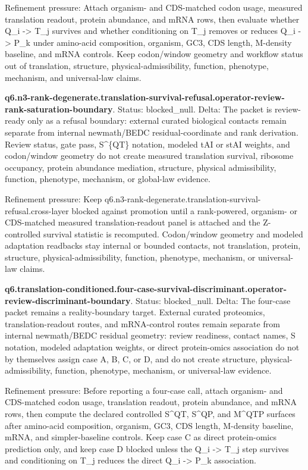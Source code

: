 Refinement pressure: Attach organism- and CDS-matched codon usage, measured translation readout, protein abundance, and mRNA rows, then evaluate whether Q\_i -> T\_j survives and whether conditioning on T\_j removes or reduces Q\_i -> P\_k under amino-acid composition, organism, GC3, CDS length, M-density baseline, and mRNA controls. Keep codon/window geometry and workflow status out of translation, structure, physical-admissibility, function, phenotype, mechanism, and universal-law claims.

\textbf{q6.n3-rank-degenerate.translation-survival-refusal.operator-review-rank-saturation-boundary}. Status: blocked\_null. Delta: The packet is review-ready only as a refusal boundary: external curated biological contacts remain separate from internal newmath/BEDC residual-coordinate and rank derivation. Review status, gate pass, S\textasciicircum{}\{QT\} notation, modeled tAI or stAI weights, and codon/window geometry do not create measured translation survival, ribosome occupancy, protein abundance mediation, structure, physical admissibility, function, phenotype, mechanism, or global-law evidence.

Refinement pressure: Keep q6.n3-rank-degenerate.translation-survival-refusal.cross-layer blocked against promotion until a rank-powered, organism- or CDS-matched measured translation-readout panel is attached and the Z-controlled survival statistic is recomputed. Codon/window geometry and modeled adaptation readbacks stay internal or bounded contacts, not translation, protein, structure, physical-admissibility, function, phenotype, mechanism, or universal-law claims.

\textbf{q6.translation-conditioned.four-case-survival-discriminant.operator-review-discriminant-boundary}. Status: blocked\_null. Delta: The four-case packet remains a reality-boundary target. External curated proteomics, translation-readout routes, and mRNA-control routes remain separate from internal newmath/BEDC residual geometry: review readiness, contact names, S notation, modeled adaptation weights, or direct protein-omics association do not by themselves assign case A, B, C, or D, and do not create structure, physical-admissibility, function, phenotype, mechanism, or universal-law evidence.

Refinement pressure: Before reporting a four-case call, attach organism- and CDS-matched codon usage, translation readout, protein abundance, and mRNA rows, then compute the declared controlled S\textasciicircum{}QT, S\textasciicircum{}QP, and M\textasciicircum{}QTP surfaces after amino-acid composition, organism, GC3, CDS length, M-density baseline, mRNA, and simpler-baseline controls. Keep case C as direct protein-omics prediction only, and keep case D blocked unless the Q\_i -> T\_j step survives and conditioning on T\_j reduces the direct Q\_i -> P\_k association.

